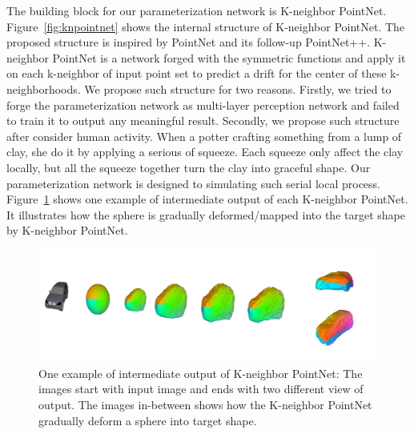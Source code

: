 The building block for our parameterization network is K-neighbor PointNet. Figure~\ref{fig:knpointnet} shows the internal structure of K-neighbor PointNet. The proposed structure is inspired by PointNet\cite{PointNet} and its follow-up PointNet++\cite{NIPS2017_7095}. K-neighbor PointNet is a network forged with the symmetric functions and apply it on each k-neighbor of input point set to predict a drift for the center of these k-neighborhoods. We propose such structure for two reasons. Firstly, we tried to forge the parameterization network as multi-layer perception network and failed to train it to output any meaningful result. Secondly, we propose such structure after consider human activity. When a potter crafting something from a lump of clay, she do it by applying a serious of squeeze. Each squeeze only affect the clay locally, but all the squeeze together turn the clay into graceful shape. Our parameterization network is designed to simulating such serial local process. Figure~\ref{fig:stepbystep} shows one example of intermediate output of each K-neighbor PointNet. It illustrates how the sphere is gradually deformed/mapped into the target shape by K-neighbor PointNet.
	\begin{figure}[htbp]
		\centering
		\includegraphics[width=\linewidth]{img/KPARAM/stepbystep}
		\caption{One example of intermediate output of K-neighbor PointNet: The images start with input image and ends with two different view of output. The images in-between shows how the K-neighbor PointNet gradually deform a sphere into target shape.}
		\label{fig:stepbystep}
	\end{figure}
